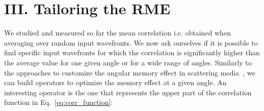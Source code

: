 \documentclass[aps,prl,twocolumn, amsmath,amssymb,superscriptaddress]{revtex4-2}
\begin{document}

\section{III. Tailoring the RME}

We studied and measured so far the mean correlation 
i.e. obtained when averaging over random input wavefronts.
We now ask ourselves if it is possible to find specific input wavefronts 
for which the correlation is significantly higher than the average value 
for one given angle or for a wide range of angles. 
Similarly to the approaches to customize the angular memory effect in scattering media~\cite{yilmaz2021customizing}, 
we can build operators to optimize the memory effect at a given angle. 
An interesting operator is the one that represents the upper part of the correlation function 
in Eq.~\ref{eq:corr_function}:
\end{document}
